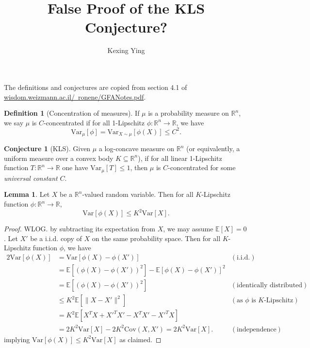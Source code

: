 \documentclass[]{article}
\title{False Proof of the KLS Conjecture?}
\author{Kexing Ying}
\theoremstyle{definition}
\newtheorem{definition}{Definition}
\newtheorem{lemma}{Lemma}
\newtheorem{conjecture}{Conjecture}
\begin{document}
\maketitle

The definitions and conjectures are copied from section 4.1 of 
\href{https://www.wisdom.weizmann.ac.il/~ronene/GFANotes.pdf}{wisdom.weizmann.ac.il/~ronene/GFANotes.pdf}.

\begin{definition}[Concentration of measures]
  If \(\mu\) is a probability measure on \(\mathbb{R}^n\), we say \(\mu\) is \(C\)-concentrated if 
  for all 1-Lipschitz \(\phi : \mathbb{R}^n \to \mathbb{R}\), we have 
  \[\text{Var}_\mu[\phi] = \text{Var}_{X \sim \mu}[\phi(X)] \le C^2.\]
\end{definition}

\begin{conjecture}[KLS]
  Given \(\mu\) a log-concave measure on \(\mathbb{R}^n\) (or equivalently, a uniform measure over a 
  convex body \(K \subseteq \mathbb{R}^n\)), if for all linear 1-Lipschitz function 
  \(T : \mathbb{R}^n \to \mathbb{R}\) one have \(\text{Var}_\mu[T] \le 1\), then \(\mu\) is 
  \(C\)-concentrated for some \textit{universal constant} \(C\).
\end{conjecture}

\begin{lemma}\label{concentration}
  Let \(X\) be a \(\mathbb{R}^n\)-valued random variable. Then for all \(K\)-Lipschitz function 
  \(\phi : \mathbb{R}^n \to \mathbb{R}\),
  \[\text{Var}[\phi(X)] \le K^2 \text{Var}[X].\]
\end{lemma}
\begin{proof}
  WLOG. by subtracting its expectation from \(X\), we may assume \(\mathbb{E}[X] = 0\).
  Let \(X'\) be a i.i.d. copy of \(X\) on the same probability space. Then for all \(K\)-Lipschitz 
  function \(\phi\), we have 
  \begin{align*}
    2 \text{Var}[\phi(X)] & = \text{Var}[\phi(X) - \phi(X')] & (\text{i.i.d.})\\
      & = \mathbb{E}[(\phi(X) - \phi(X'))^2] - \mathbb{E}[\phi(X) - \phi(X')]^2 & \\
      & = \mathbb{E}[(\phi(X) - \phi(X'))^2] & (\text{identically distributed}) \\
      & \le K^2 \mathbb{E}[\|X - X'\|^2] & (\text{as \(\phi\) is \(K\)-Lipschitz}) \\
      & = K^2 \mathbb{E}[X^T X + X'^T X' - X^T X' - X'^T X] & \\
      & = 2K^2 \text{Var}[X] - 2K^2 \text{Cov}(X, X') = 2K^2 \text{Var}[X]. & (\text{independence})
  \end{align*}
  implying \(\text{Var}[\phi(X)] \le K^2 \text{Var}[X]\) as claimed.
\end{proof}
\end{document}
